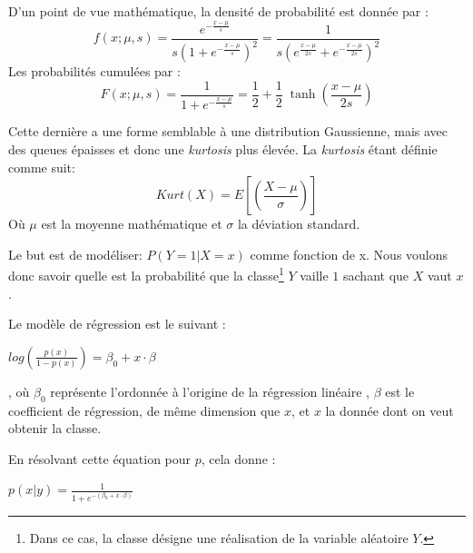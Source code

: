 \documentclass[a4paper, 11pt]{article}
\begin{document}
D'un point de vue mathématique, la densité de probabilité est donnée par :
$$f(x; \mu,s) = \frac{e^{-\frac{x-\mu}{s}}} {s\left(1+e^{-\frac{x-\mu}{s}}\right)^2}
=\frac{1}{s\left(e^{\frac{x-\mu}{2s}}+e^{-\frac{x-\mu}{2s}}\right)^2}$$
Les probabilités cumulées par :
$$F(x; \mu, s) = \frac{1}{1+e^{-\frac{x-\mu}{s}}} = \frac12 + \frac12 \;\operatorname{tanh}\!\left(\frac{x-\mu}{2s}\right)$$

Cette dernière a une forme semblable à une distribution Gaussienne, 
mais avec des queues épaisses et donc une \textit{kurtosis} plus élevée. La \textit{kurtosis} étant définie comme suit:
$$Kurt(X) = E\left[\left(\frac{X - \mu}{\sigma}\right)\right]$$
Où $\mu$ est la moyenne mathématique et $\sigma$ la déviation standard. 

Le but est de modéliser: $P(Y=1 | X=x)$ comme fonction de x. Nous voulons donc savoir quelle est la probabilité que 
la classe\footnote{Dans ce cas, la classe désigne une réalisation de la variable aléatoire $Y$.} $Y$ vaille $1$ sachant que $X$ vaut $x$.

Le modèle de régression est le suivant \cite{machine_learning_automated_trading}:
\begin{center}
$log(\frac{p(x)}{1 - p(x)}) = \beta_0 + x \cdot \beta$
\end{center}
, où $\beta_0$ représente l'ordonnée à l'origine de la régression linéaire
, $\beta$ est le coefficient de régression, de même dimension que $x$, et $x$ la donnée dont on veut obtenir la classe.

En résolvant cette équation pour $p$, cela donne \cite{machine_learning_automated_trading}:
\begin{center}
$p(x|y) = \frac{1}{1 + e^{-(\beta_0 + x \cdot \beta)}}$
\end{center}
\end{document}
